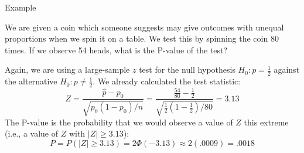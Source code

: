 \documentclass[handout]{beamer}
\begin{document}
\begin{frame}{Example}
\begin{block}{}
We are given a coin which someone suggests may give outcomes with unequal proportions when we spin it on a table. We test this by spinning the coin 80 times. If we observe 54 heads, what is the P-value of the test?
\end{block}
\pause Again, we are using a large-sample $z$ test for the null hypothesis $H_0: p=\frac12$ against the alternative $H_0: p\neq\frac12$. \pause We already calculated the test statistic:
$$Z=\frac{\hat p-p_0}{\sqrt{p_0(1-p_0)/n}}=\frac{\frac{54}{80}-\frac12}{\sqrt{\frac12(1-\frac12)/80}}=3.13$$
\pause The P-value is the probability that we would observe a value of $Z$ this extreme (i.e., a value of $Z$ with $|Z|\geq 3.13$):
$$ P = P(|Z|\geq 3.13) = 2\Phi(-3.13) \approx 2(.0009) = .0018$$ 

\end{frame}
\end{document}
